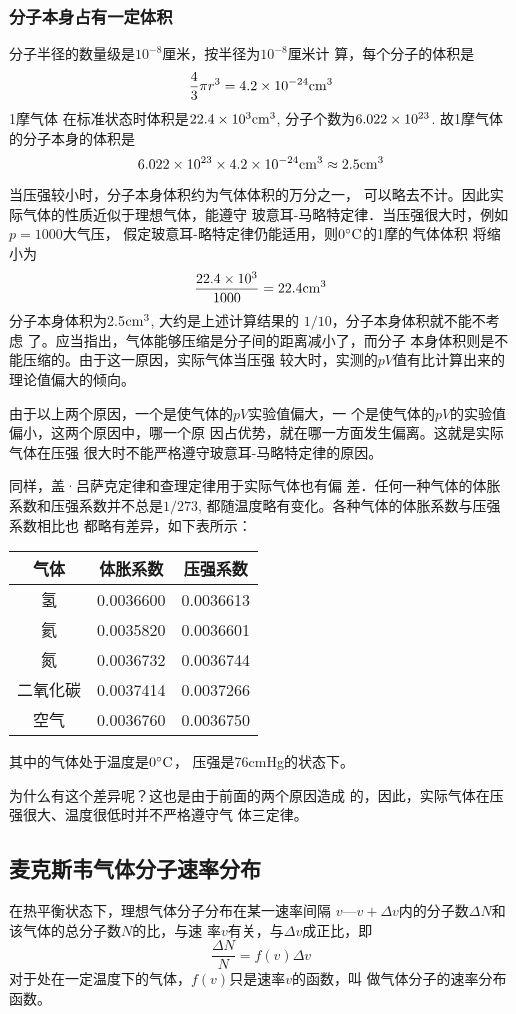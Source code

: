 \subsubsection{分子本身占有一定体积}

分子半径的数量级是$10^{-8}$厘米，按半径为$10^{-8}$厘米计
算，每个分子的体积是
\[\frac{4}{3}\pi r^3=4.2\times 10^{-24}{\rm cm^3}\]
1摩气体
在标准状态时体积是$22.4\times10^3{\rm cm^3}$, 分子个数为$6.022
\times10^{23}$. 故1摩气体的分子本身的体积是$$6.022\times10^{23}\times4.2
\times10^{-24}{\rm cm^3}\approx 2.5{\rm cm^3}$$

当压强较小时，分子本身体积约为气体体积的万分之一，
可以略去不计。因此实际气体的性质近似于理想气体，能遵守
玻意耳-马略特定律．当压强很大时，例如$p=1000$大气压，
假定玻意耳-略特定律仍能适用，则$0^{\circ}{\rm C}$的1摩的气体体积
将缩小为
\[\frac{22.4\times 10^3}{1000}=22.4{\rm cm^3}\]
分子本身体积为2.5${\rm cm^3}$, 大约是上述计算结果的
$1/10$，分子本身体积就不能不考虑
了。应当指出，气体能够压缩是分子间的距离减小了，而分子
本身体积则是不能压缩的。由于这一原因，实际气体当压强
较大时，实测的$pV$值有比计算出来的理论值偏大的倾向。

由于以上两个原因，一个是使气体的$pV$实验值偏大，一
个是使气体的$pV$的实验值偏小，这两个原因中，哪一个原
因占优势，就在哪一方面发生偏离。这就是实际气体在压强
很大时不能严格遵守玻意耳-马略特定律的原因。

同样，盖·吕萨克定律和查理定律用于实际气体也有偏
差．任何一种气体的体胀系数和压强系数并不总是$1/273$,
都随温度略有变化。各种气体的体胀系数与压强系数相比也
都略有差异，如下表所示：
\begin{center}
    \begin{tabular}{ccc}
\hline
气体  & 体胀系数&压强系数\\
\hline
氢&0.0036600&0.0036613\\
氦&0.0035820&0.0036601\\
氮&0.0036732&0.0036744\\
二氧化碳&0.0037414&0.0037266\\
空气&0.0036760&0.0036750\\
\hline
    \end{tabular}
\end{center}
其中的气体处于温度是$0^{\circ}{\rm C}$，
压强是76cmHg的状态下。


为什么有这个差异呢？这也是由于前面的两个原因造成
的，因此，实际气体在压强很大、温度很低时并不严格遵守气
体三定律。

\subsection{麦克斯韦气体分子速率分布}
在热平衡状态下，理想气体分子分布在某一速率间隔
$v$—$v+\Delta v$内的分子数$\Delta N$和该气体的总分子数$N$的比，与速
率$v$有关，与$\Delta v$成正比，即
\[\frac{\Delta N}{N}=f(v)\Delta v\]
对于处在一定温度下的气体，$f(v)$只是速率$v$的函数，叫
做气体分子的速率分布函数。

